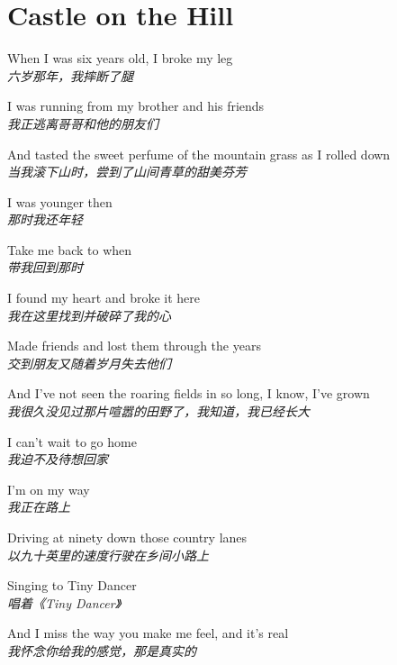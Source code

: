 \section{Castle on the Hill}

\thispagestyle{empty}


\begin{spacing}{1.5}
\begin{flushleft}
When I was six years old, I broke my leg\\
\textit{六岁那年，我摔断了腿}\lyricspace

I was running from my brother and his friends\\
\textit{我正逃离哥哥和他的朋友们}\lyricspace

And tasted the sweet perfume of the mountain grass as I rolled down\\
\textit{当我滚下山时，尝到了山间青草的甜美芬芳}\lyricspace

I was younger then\\
\textit{那时我还年轻}\lyricspace

Take me back to when\\
\textit{带我回到那时}\lyricspace

I found my heart and broke it here\\
\textit{我在这里找到并破碎了我的心}\lyricspace

Made friends and lost them through the years\\
\textit{交到朋友又随着岁月失去他们}\lyricspace

And I've not seen the roaring fields in so long, I know, I've grown\\
\textit{我很久没见过那片喧嚣的田野了，我知道，我已经长大}\lyricspace

I can't wait to go home\\
\textit{我迫不及待想回家}\lyricspace

I'm on my way\\
\textit{我正在路上}\lyricspace

Driving at ninety down those country lanes\\
\textit{以九十英里的速度行驶在乡间小路上}\lyricspace

Singing to Tiny Dancer\\
\textit{唱着《Tiny Dancer》}\lyricspace

And I miss the way you make me feel, and it's real\\
\textit{我怀念你给我的感觉，那是真实的}\lyricspace


\end{flushleft}
\end{spacing}
